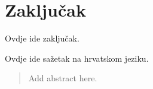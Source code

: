 \documentclass[times, utf8, diplomski, numeric]{templates/template}
\begin{document}
\chapter{Zaključak}
Ovdje ide zaključak.




\begin{sazetak}
Ovdje ide sažetak na hrvatskom jeziku.

\end{sazetak}

\begin{abstract}
Add abstract here.

\end{abstract}
\end{document}
